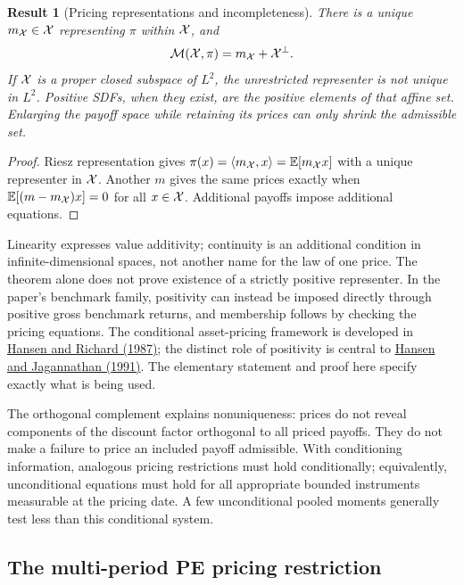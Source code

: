 \documentclass[11pt]{article}
\newcommand{\E}{\mathbb{E}}
\theoremstyle{plain}
\newtheorem{result}{Result}[section]
\theoremstyle{definition}
\begin{document}
\begin{result}[Pricing representations and incompleteness]
\label{res:admissible}
There is a unique $m_{\mathcal{X}}\in\mathcal{X}$ representing $\pi$ within $\mathcal{X}$, and
\[
\mathcal{M}(\mathcal{X},\pi)=m_{\mathcal{X}}+\mathcal{X}^\perp.
\]
If $\mathcal{X}$ is a proper closed subspace of $L^2$, the unrestricted representer is not unique in $L^2$. Positive SDFs, when they exist, are the positive elements of that affine set. Enlarging the payoff space while retaining its prices can only shrink the admissible set.
\end{result}
\begin{proof}
Riesz representation gives $\pi(x)=\langle m_{\X},x\rangle=\E[m_{\X}x]$ with a unique representer in $\mathcal{X}$. Another $m$ gives the same prices exactly when $\E[(m-m_{\X})x]=0$ for all $x\in\mathcal{X}$. Additional payoffs impose additional equations.
\end{proof}

Linearity expresses value additivity; continuity is an additional condition in infinite-dimensional spaces, not another name for the law of one price. The theorem alone does not prove existence of a strictly positive representer. In the paper's benchmark family, positivity can instead be imposed directly through positive gross benchmark returns, and membership follows by checking the pricing equations. The conditional asset-pricing framework is developed in \href{https://larspeterhansen.org/lph_research/the-role-of-conditioning-information-in-deducing-testable-restrictions-implied-by-dynamic-asset-pricing-models/}{Hansen and Richard (1987)}; the distinct role of positivity is central to \href{https://larspeterhansen.org/lph_research/implications-of-security-market-data-for-models-of-dynamic-economies/}{Hansen and Jagannathan (1991)}. The elementary statement and proof here specify exactly what is being used.

The orthogonal complement explains nonuniqueness: prices do not reveal components of the discount factor orthogonal to all priced payoffs. They do not make a failure to price an included payoff admissible. With conditioning information, analogous pricing restrictions must hold conditionally; equivalently, unconditional equations must hold for all appropriate bounded instruments measurable at the pricing date. A few unconditional pooled moments generally test less than this conditional system.

\subsection{The multi-period PE pricing restriction}
\end{document}
